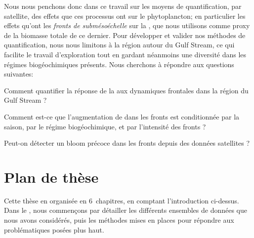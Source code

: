 Nous nous penchons donc dans ce travail sur les moyens de quantification, par satellite, des effets que ces processus ont sur le phytoplancton; en particulier les effets qu'ont les \emph{fronts de submésoéchelle} sur la \emph{}, que nous utilisons comme proxy de la biomasse totale de ce dernier.
Pour développer et valider nos méthodes de quantification, nous nous limitons à la région autour du Gulf Stream, ce qui facilite le travail d'exploration tout en gardant néanmoins une diversité dans les régimes biogéochimiques présents.
Nous cherchons à répondre aux questions suivantes:

\begin{tcolorbox}[
  enhanced,
  frame hidden, interior hidden,
  borderline={1.pt}{3pt}{black}, arc=2.mm,
  borderline north={1.2pt}{0pt}{black},
  borderline south={1.2pt}{0pt}{black},
  borderline west={1.2pt}{0pt}{black},
  borderline east={1.2pt}{0pt}{black},
  top=2\onelineskip,
  bottom=2\onelineskip,
  left=1.em, right=0.9em,
  ]
  \begin{list}{}{
      \setlength{\labelsep}{0.5em}
      \setlength{\itemindent}{0pt}
      \setlength{\leftmargin}{1em}
      \setlength{\labelwidth}{0.5em}
      \setlength{\listparindent}{0pt}
      \setlength{\parsep}{\parskip}
      \setlength{\itemsep}{\onelineskip}
      \setlength{\topsep}{\onelineskip}
      \renewcommand*\makelabel[1]{\adfrightarrowhead}}
    \item Comment quantifier la réponse de la  aux dynamiques frontales dans la région du Gulf Stream ?
    \item Comment est-ce que l'augmentation de  dans les fronts est conditionnée par la saison, par le régime biogéochimique, et par l'intensité des fronts ?
    \item Peut-on détecter un bloom précoce dans les fronts depuis des données satellites ?
  \end{list}
\end{tcolorbox}

\section{Plan de thèse}
\label{sec:plan-de-these}

Cette thèse en organisée en 6~chapitres, en comptant l'introduction ci-dessus.
Dans le , nous commençons par détailler les différents ensembles de données que nous avons considérés, puis les méthodes mises en places pour répondre aux problématiques posées plus haut.

